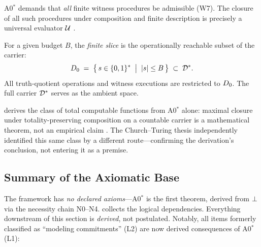 \begin{proposition}
\label{prop:utm-forced}
A0$^*$ demands that \emph{all} finite witness procedures be admissible (W7).
The closure of all such procedures under composition and finite description
is precisely a universal evaluator $\mathcal{U}$ \citep{rogers1967}.

\end{proposition}

\begin{definition}
\label{def:finite-slice}
For a given budget $B$, the \emph{finite slice} is the operationally
reachable subset of the carrier:
\[
  D_0 \;=\; \bigl\{\, s \in \{0,1\}^* \;\bigm|\; |s| \leq B \,\bigr\}
    \;\subset\; \mathcal{D}^*.
\]
All truth-quotient operations and witness executions are restricted to
$D_0$.  The full carrier $\mathcal{D}^*$ serves as the ambient space.
\end{definition}

\begin{remark}
\label{rem:ct-dependency}
 derives the class of total computable functions
from A0$^*$ alone: maximal closure under totality-preserving composition on
a countable carrier is a mathematical theorem, not an empirical claim
\citep{rogers1967}.  The Church--Turing thesis independently identified
this same class by a different route---confirming the derivation's
conclusion, not entering it as a premise.
\end{remark}

\subsection{Summary of the Axiomatic Base}
\label{sec:axioms:summary}

The framework has \emph{no declared axioms}---A0$^*$ is the first
theorem, derived from $\bot$ via the necessity chain N0--N4.
 collects the logical dependencies.  Everything
downstream of this section is \emph{derived}, not postulated.  Notably,
all items formerly classified as ``modeling commitments'' (L2) are now
derived consequences of A0$^*$ (L1):

